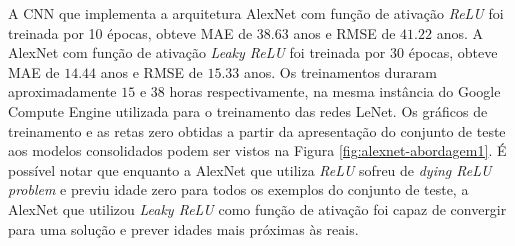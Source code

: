 A CNN que implementa a arquitetura AlexNet com função de ativação \emph{ReLU} foi treinada por 10 épocas, obteve MAE de $38.63$ anos e RMSE de $41.22$ anos. A AlexNet com função de ativação \emph{Leaky ReLU} foi treinada por 30 épocas, obteve MAE de $14.44$ anos e RMSE de $15.33$ anos. Os treinamentos duraram aproximadamente $15$ e $38$ horas respectivamente, na mesma instância do Google Compute Engine utilizada para o treinamento das redes LeNet. Os gráficos de treinamento e as retas zero obtidas a partir da apresentação do conjunto de teste aos modelos consolidados podem ser vistos na Figura \ref{fig:alexnet-abordagem1}. É possível notar que enquanto a AlexNet que utiliza \emph{ReLU} sofreu de \emph{dying ReLU problem} e previu idade zero para todos os exemplos do conjunto de teste, a AlexNet que utilizou \emph{Leaky ReLU} como função de ativação foi capaz de convergir para uma solução e prever idades mais próximas às reais.

